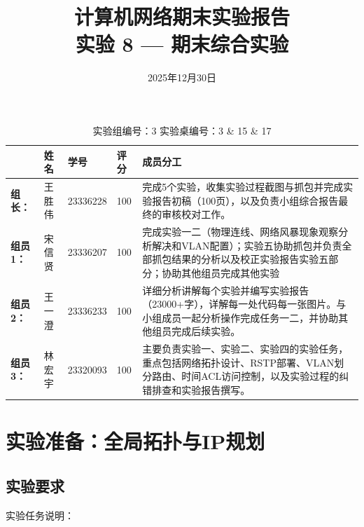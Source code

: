 \documentclass[12pt, a4paper]{article}
\title{
    \vspace{1cm}
    \textbf{\huge 计算机网络期末实验报告} \\
    \vspace{0.5cm}
    \textbf{\Large 实验 8 — 期末综合实验} \\
    \vspace{1.5cm}
}
\author{}
\date{2025年12月30日}
\begin{document}
\maketitle
\thispagestyle{empty}

\begin{table}[H]
    \centering
    \vspace{0.5cm}
    \renewcommand{\arraystretch}{1.5}
    \small 
    
    \begin{tabular}{|p{2cm}|p{2cm}|p{2.5cm}|p{2cm}|p{6cm}|}
        \hline
        & \textbf{姓名} & \textbf{学号} & \textbf{评分} & \textbf{成员分工} \\ \hline
        \textbf{组长：} & 王胜伟 & 23336228 & 100 & 完成5个实验，收集实验过程截图与抓包并完成实验报告初稿（100页），以及负责小组综合报告最终的审核校对工作。\\ \hline
        \textbf{组员 1：} & 宋信贤 & 23336207 & 100 & 完成实验一二（物理连线、网络风暴现象观察分析解决和VLAN配置）；实验五协助抓包并负责全部抓包结果的分析以及校正实验报告实验五部分；协助其他组员完成其他实验\\ \hline
        \textbf{组员 2：} & 王一澄 & 23336233 & 100 & 详细分析讲解每个实验并编写实验报告（23000+字），详解每一处代码每一张图片。与小组成员一起分析操作完成任务一二，并协助其他组员完成后续实验。 \\ \hline
        \textbf{组员 3：} & 林宏宇 & 23320093 & 100 & 主要负责实验一、实验二、实验四的实验任务，重点包括网络拓扑设计、RSTP部署、VLAN划分路由、时间ACL访问控制，以及实验过程的纠错排查和实验报告撰写。\\ \hline
    \end{tabular}
    
    \vspace{0.8cm}
    \caption*{实验组编号：3 \quad 实验桌编号：3 \& 15 \& 17}
\end{table}

\newpage
\tableofcontents
\newpage

\section{实验准备：全局拓扑与IP规划}

\subsection{实验要求}

实验任务说明：
\end{document}
